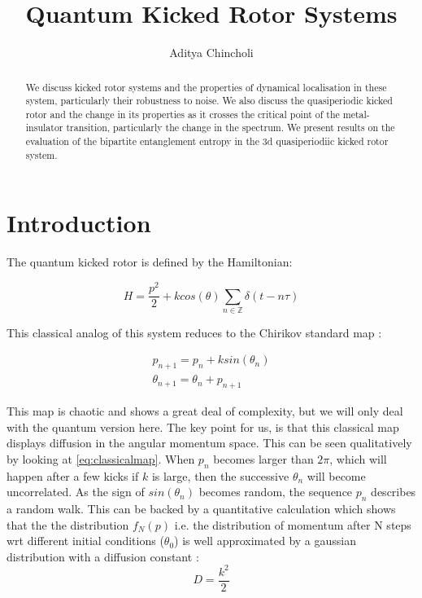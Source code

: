 \documentclass[twocolumn,nobalancelastpage]{report}
\title{Quantum Kicked Rotor Systems}
\author{Aditya Chincholi}
\begin{document}
\maketitle

\onecolumn
\tableofcontents

\begin{abstract}
We discuss kicked rotor systems and the properties of dynamical
localisation in these system, particularly their robustness to
noise. We also discuss the quasiperiodic kicked rotor and the
change in its properties as it crosses the critical point of the
metal-insulator transition, particularly the change in the spectrum.
We present results on the evaluation of the bipartite entanglement
entropy in the 3d quasiperiodiic kicked rotor system.
\end{abstract}

\twocolumn
\chapter{Introduction}
The quantum kicked rotor is defined by the Hamiltonian:

\begin{equation}
H = \frac{p^2}{2} + k cos(\theta) \sum_{n \in \mathbb{Z}} \delta(t - n\tau)
\end{equation}

This classical analog of this system reduces to the Chirikov standard map
\cite{stockmann}:

\begin{align}
    p_{n+1} = p_n + k sin(\theta_n) \\
    \theta_{n+1} = \theta_n + p_{n+1} \label{eq:classicalmap}
\end{align}

This map is chaotic and shows a great deal of complexity, but we will only
deal with the quantum version here. The key point for us, is that this
classical map displays diffusion in the angular momentum space. This can be
seen qualitatively by looking at \ref{eq:classicalmap}. When $p_n$ becomes
larger than $2\pi$, which will happen after a few kicks if $k$ is large,
then the successive $\theta_n$ will become uncorrelated. As the sign of
$sin(\theta_n)$ becomes random, the sequence ${p_n}$ describes a random walk.
This can be backed by a quantitative calculation which shows that the
the distribution $f_N(p)$ i.e. the distribution of momentum after N steps
wrt different initial conditions ($\theta_0$) is well approximated by a
gaussian distribution with a diffusion constant \cite{stockmann}:
\begin{equation}
    D = \frac{k^2}{2}
\end{equation}
\end{document}
